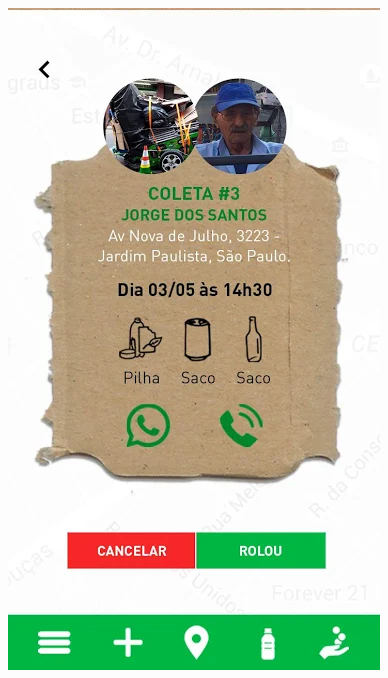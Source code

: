 \documentclass[
	12pt,				%
	openright,			%
	twoside,			%
	a4paper,			%
	english,			%
	french,				%
	spanish,			%
	brazil				%
	]{abntex2}
\begin{document}
\begin{figure}[htb]
\begin{minipage}{0.45\textwidth}
    \includegraphics[scale=0.45]{media/infocatador.png}
     \label{fig:figura2}
  \end{minipage}
\end{figure}
\end{document}
